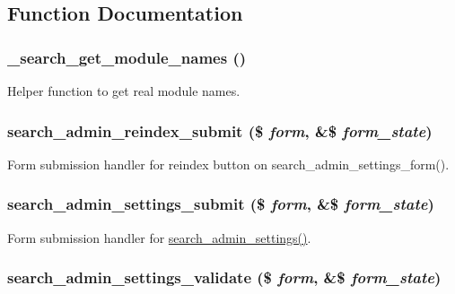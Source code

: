 \subsection{Function Documentation}
\hypertarget{search_8admin_8inc_af1d9d6ecf1417767a171324886297b96}{
\subsubsection[{\_\-search\_\-get\_\-module\_\-names}]{\setlength{\rightskip}{0pt plus 5cm}\_\-search\_\-get\_\-module\_\-names ()}}
\label{search_8admin_8inc_af1d9d6ecf1417767a171324886297b96}
Helper function to get real module names. \hypertarget{search_8admin_8inc_af58628d37095963f5e991d357535e957}{
\subsubsection[{search\_\-admin\_\-reindex\_\-submit}]{\setlength{\rightskip}{0pt plus 5cm}search\_\-admin\_\-reindex\_\-submit (\$ {\em form}, \/  \&\$ {\em form\_\-state})}}
\label{search_8admin_8inc_af58628d37095963f5e991d357535e957}
Form submission handler for reindex button on search\_\-admin\_\-settings\_\-form(). \hypertarget{search_8admin_8inc_a805559246fe20818784c24c1f95dbaf9}{
\subsubsection[{search\_\-admin\_\-settings\_\-submit}]{\setlength{\rightskip}{0pt plus 5cm}search\_\-admin\_\-settings\_\-submit (\$ {\em form}, \/  \&\$ {\em form\_\-state})}}
\label{search_8admin_8inc_a805559246fe20818784c24c1f95dbaf9}
Form submission handler for \hyperlink{group__forms_gaa2b01af13156640d290f3a3c6042bd3a}{search\_\-admin\_\-settings()}. \hypertarget{search_8admin_8inc_ac02dbfc93e16ceefc020a119da393584}{
\subsubsection[{search\_\-admin\_\-settings\_\-validate}]{\setlength{\rightskip}{0pt plus 5cm}search\_\-admin\_\-settings\_\-validate (\$ {\em form}, \/  \&\$ {\em form\_\-state})}}

